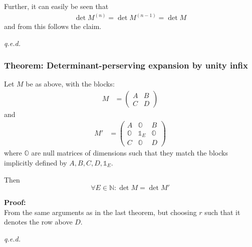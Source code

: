 \documentclass[
	english,
	a4paper,
	fontsize=10pt,
	parskip=half,
	titlepage=true,
	DIV=12,
	final
]{scrreprt}
\newcommand*{\setNaturals} {\ensuremath{\mathbb{N}}}
\begin{document}
Further, it can easily be seen that
\begin{align}
	\det M^{(n)} = \det M^{(n-1)} = \det M
\end{align}
and from this follows the claim.
\begin{flushright}
	\emph{q.e.d.}
\end{flushright}

\subsubsection{Theorem: Determinant-perserving expansion by unity infix}
Let $M$ be as above, with the blocks:
\begin{align}
	M
&=
	\begin{pmatrix}
		A & B \\ C & D
	\end{pmatrix}
\end{align}
and
\begin{align}
	M'
&=
	\begin{pmatrix}
		A & \mathds{O} & B \\
		\mathds{O} & \mathds{1}_{E} & \mathds{O} \\
		C & \mathds{O} & D
	\end{pmatrix}
\end{align}
where $\mathds{O}$ are null matrices of dimensions such that they match the blocks implicitly defined by $A, B, C, D, \mathds{1}_{E}$.

Then
\[ \forall E \in \setNaturals : \det M = \det M' \]

\textbf{Proof:}\\
From the same arguments as in the last theorem, but choosing $r$ such that it denotes the row above $D$.
\begin{flushright}
	\emph{q.e.d.}
\end{flushright}
\end{document}
